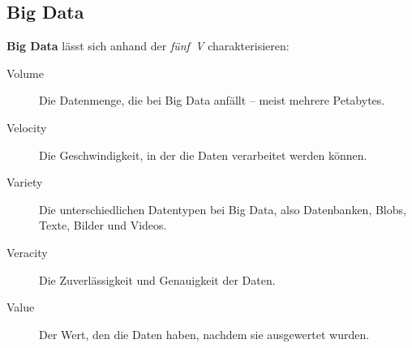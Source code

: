 \subsection{Big Data}
\textbf{Big Data} lässt sich anhand der \emph{fünf~V} charakterisieren:
\begin{description}
  \item[Volume] Die Datenmenge, die bei Big Data anfällt -- meist mehrere
    Petabytes.
  \item[Velocity] Die Geschwindigkeit, in der die Daten verarbeitet werden
    können.
  \item[Variety] Die unterschiedlichen Datentypen bei Big Data, also
    Datenbanken, Blobs, Texte, Bilder und Videos.
  \item[Veracity] Die Zuverlässigkeit und Genauigkeit der Daten.
  \item[Value] Der Wert, den die Daten haben, nachdem sie ausgewertet wurden.
\end{description}